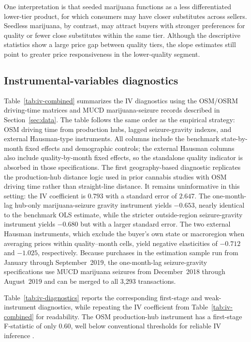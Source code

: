 One interpretation is that seeded marijuana functions as a less differentiated lower-tier product, for which consumers may have closer substitutes across sellers.  Seedless marijuana, by contrast, may attract buyers with stronger preferences for quality or fewer close substitutes within the same tier.  Although the descriptive statistics show a large price gap between quality tiers, the slope estimates still point to greater price responsiveness in the lower-quality segment.



\subsection{Instrumental-variables diagnostics}

Table~\ref{tab:iv-combined} summarizes the IV diagnostics using the OSM/OSRM driving-time matrices and MUCD marijuana-seizure records described in Section~\ref{sec:data}.  The table follows the same order as the empirical strategy: OSM driving time from production hubs, lagged seizure-gravity indexes, and external Hausman-type instruments.  All columns include the benchmark state-by-month fixed effects and demographic controls; the external Hausman columns also include quality-by-month fixed effects, so the standalone quality indicator is absorbed in those specifications.  The first geography-based diagnostic replicates the production-hub distance logic used in prior cannabis studies with OSM driving time rather than straight-line distance.  It remains uninformative in this setting: the IV coefficient is $0.793$ with a standard error of $2.647$.  The one-month-lag hub-only marijuana-seizure gravity instrument yields $-0.653$, nearly identical to the benchmark OLS estimate, while the stricter outside-region seizure-gravity instrument yields $-0.680$ but with a larger standard error.  The two external Hausman instruments, which exclude the buyer's own state or macroregion when averaging prices within quality--month cells, yield negative elasticities of $-0.712$ and $-1.025$, respectively.  Because purchases in the estimation sample run from January through September~2019, the one-month-lag seizure-gravity specifications use MUCD marijuana seizures from December~2018 through August~2019 and can be merged to all 3{,}293 transactions.



Table~\ref{tab:iv-diagnostics} reports the corresponding first-stage and weak-instrument diagnostics, while repeating the IV coefficient from Table~\ref{tab:iv-combined} for readability.  The OSM production-hub instrument has a first-stage F-statistic of only $0.60$, well below conventional thresholds for reliable IV inference \citep{staiger1997instrumental,stock2005testing}.

